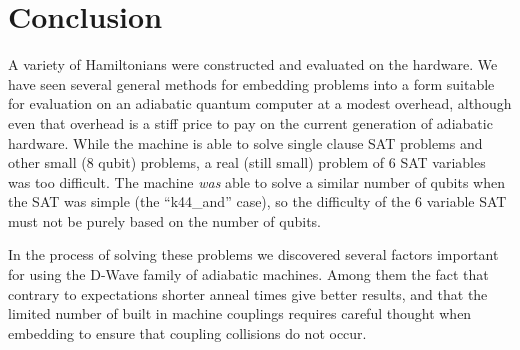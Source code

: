 \chapter{Conclusion}
A variety of Hamiltonians were constructed and evaluated on the \machine hardware.  We have seen several general methods for embedding problems into a form suitable for evaluation on an adiabatic quantum computer at a modest overhead, although even that overhead is a stiff price to pay on the current generation of adiabatic hardware.  While the machine is able to solve single clause SAT problems and other small (8 qubit) problems, a real (still small) problem of 6 SAT variables was too difficult. The machine \emph{was} able to solve a similar number of qubits when the SAT was simple (the ``k44\_and'' case), so the difficulty of the 6 variable SAT must not be purely based on the number of qubits.  

In the process of solving these problems we discovered several factors important for using the D-Wave family of adiabatic machines.  Among them the fact that contrary to expectations shorter anneal times give better results, and that the limited number of built in machine couplings requires careful thought when embedding to ensure that coupling collisions do not occur.
